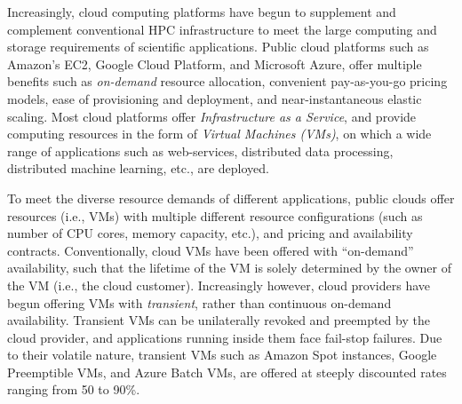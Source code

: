 
Increasingly, cloud computing platforms have begun to supplement and complement conventional HPC infrastructure  to meet the large computing and storage requirements of scientific applications. Public cloud platforms such as Amazon's EC2, Google Cloud Platform, and Microsoft Azure, offer multiple benefits such as \emph{on-demand} resource allocation, convenient pay-as-you-go pricing models, ease of provisioning and deployment, and near-instantaneous elastic scaling.
Most cloud platforms offer \emph{Infrastructure as a Service}, and provide computing resources in the form of \emph{Virtual Machines (VMs)}, on which a wide range of  applications such as web-services, distributed data processing, distributed machine learning, etc., are deployed.





To  meet the diverse resource demands of different applications, public clouds offer resources (i.e., VMs) with multiple different resource configurations (such as number of CPU cores,  memory capacity, etc.), and pricing and availability contracts. 
Conventionally, cloud VMs have been offered with ``on-demand'' availability, such that the lifetime of the VM is solely determined by the owner of the VM (i.e., the cloud customer). 
Increasingly however, cloud providers have begun offering VMs with \emph{transient}, rather than continuous on-demand availability. 
Transient VMs can be unilaterally revoked and preempted by the cloud provider, and applications running inside them face fail-stop failures. 
Due to their volatile nature, transient VMs such as Amazon Spot instances, Google Preemptible VMs, and Azure Batch VMs, are offered at steeply discounted rates ranging from 50 to 90\%.

